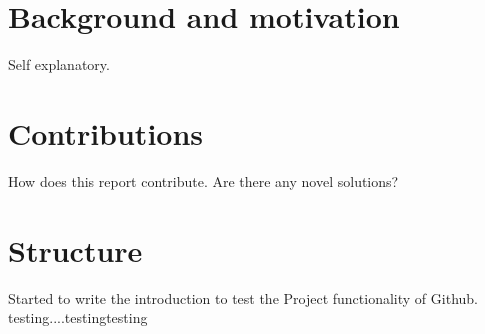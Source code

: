 \section*{Background and motivation}
Self explanatory. 
\section*{Contributions}
How does this report contribute. Are there any novel solutions?
\section*{Structure}
Started to write the introduction to test the Project functionality of Github. 
testing....testingtesting
